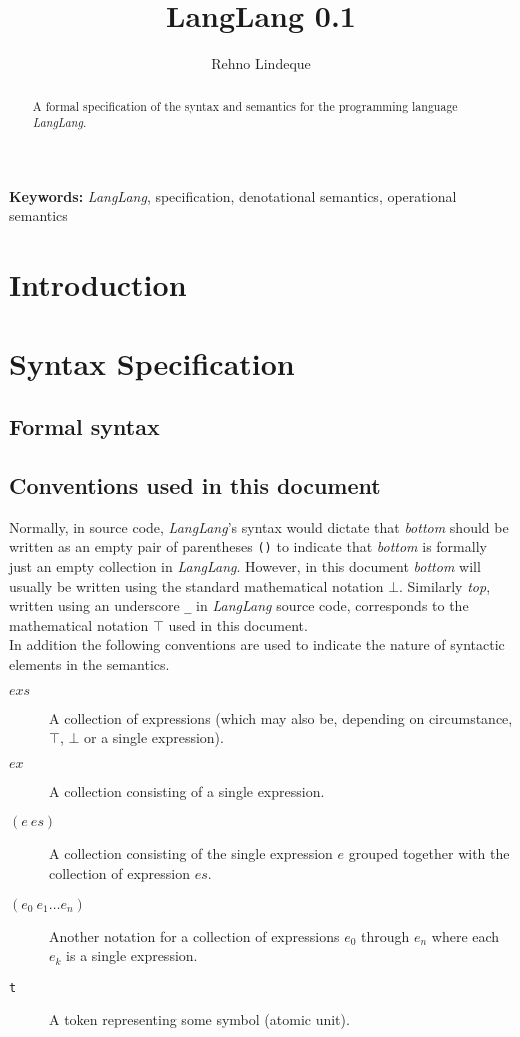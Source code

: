 \documentclass[a4paper,11pt]{article}
\begin{document}
\title{LangLang 0.1}
\author{Rehno Lindeque}

\maketitle

\begin{abstract}
A formal specification of the syntax and semantics for the programming language \textsl{LangLang}.
\end{abstract}
\textbf{Keywords:} \textsl{LangLang}, specification, denotational semantics, operational semantics

\section{Introduction}

\section{Syntax Specification}
\subsection{Formal syntax}

\subsection{Conventions used in this document}
\label{sec:conventions}

Normally, in source code, \textsl{LangLang}'s syntax would dictate that \emph{bottom} should be written as an empty pair of parentheses \texttt{()} to indicate that \emph{bottom} is formally just an empty collection in \textsl{LangLang}.
However, in this document \emph{bottom} will usually be written using the standard mathematical notation $\bot$.
Similarly \emph{top}, written using an underscore \texttt{\_} in \textsl{LangLang} source code, corresponds to the mathematical notation $\top$ used in this document.\\

In addition the following conventions are used to indicate the nature of syntactic elements in the semantics.

\begin{description}
  \item[$exs$] A collection of expressions (which may also be, depending on circumstance, $\top$, $\bot$ or a single expression).
  \item[$ex$] A collection consisting of a single expression.
  \item[$(e\ es)$] A collection consisting of the single expression $e$ grouped together with the collection of expression $es$.
  \item[$(e_0\ e_1 \dots e_n)$] Another notation for a collection of expressions $e_0$ through $e_n$ where each $e_k$ is a single expression.
  \item[\texttt{t}] A token representing some symbol (atomic unit).
\end{description}
\end{document}

